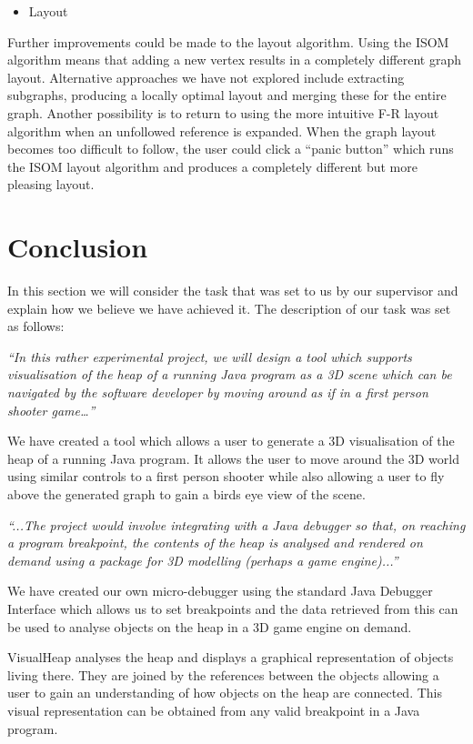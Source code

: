\documentclass[11pt, a4paper]{report}
\begin{document}
\begin{itemize}
  \item Layout
\end{itemize}

Further improvements could be made to the layout algorithm. Using the ISOM algorithm means that adding a new vertex results in a completely different graph layout. Alternative approaches we have not explored include extracting subgraphs, producing a locally optimal layout and merging these for the entire graph. Another possibility is to return to using the more intuitive F-R layout algorithm when an unfollowed reference is expanded. When the graph layout becomes too difficult to follow, the user could click a “panic button” which runs the ISOM layout algorithm and produces a completely different but more pleasing layout.

\chapter{Conclusion}

In this section we will consider the task that was set to us by our supervisor and explain how we believe we have achieved it. The description of our task was set as follows:

\emph{``In this rather experimental project, we will design a tool which supports visualisation of the heap of a running Java program as a 3D scene which can be navigated by the software developer by moving around as if in a first person shooter game…''}

We have created a tool which allows a user to generate a 3D visualisation of the heap of a running Java program. It allows the user to move around the 3D world using similar controls to a first person shooter while also allowing a user to fly above the generated graph to gain a birds eye view of the scene. 

\emph{``...The project would involve integrating with a Java debugger so that, on reaching a program breakpoint, the contents of the heap is analysed and rendered on demand using a package for 3D modelling (perhaps a game engine)...''}

We have created our own micro-debugger using the standard Java Debugger Interface which allows us to set breakpoints and the data retrieved from this can be used to analyse objects on the heap in a 3D game engine on demand.

VisualHeap analyses the heap and displays a graphical representation of objects living there. They are joined by the references between the objects allowing a user to gain an understanding of how objects on the heap are connected. This visual representation can be obtained from any valid breakpoint in a Java program.
\end{document}
